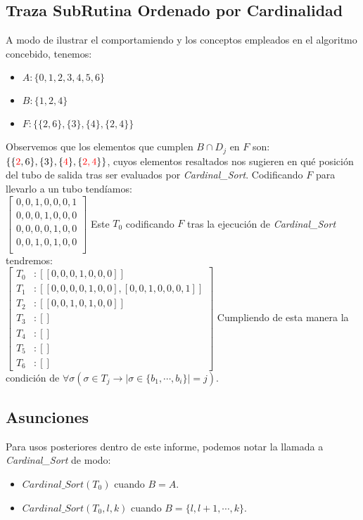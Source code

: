 \documentclass[12pt, letterpaper, twoside]{article}
\begin{document}
    \subsection{Traza SubRutina Ordenado por Cardinalidad}
    A modo de ilustrar el comportamiendo y los conceptos empleados en el algoritmo concebido, tenemos:
    \begin{itemize}
        \item $A: \{0, 1, 2, 3, 4, 5, 6\}$
        \item $B: \{1, 2, 4\}$
        \item $F: \{\{2, 6\}, \{3\}, \{4\}, \{2, 4\}\}$
    \end{itemize}
    Observemos que los elementos que cumplen $B\cap D_j$ en $F$ son: $\{\{\textcolor{red}{2}, 6\}, \{3\}, \{\textcolor{red}{4}\}, \{\textcolor{red}{2, 4}\}\}$, cuyos elementos resaltados nos sugieren en qué posición del tubo de salida tras ser evaluados por \emph{Cardinal\_Sort}. Codificando $F$ para llevarlo a un tubo tendíamos: \\
    $
        \begin{bmatrix}
            0, 0, 1, 0, 0, 0, 1 \\
            0, 0, 0, 1, 0, 0, 0 \\
            0, 0, 0, 0, 1, 0, 0 \\
            0, 0, 1, 0, 1, 0, 0 \\
        \end{bmatrix}
    $
    Este $T_0$ codificando $F$ tras la ejecución de \emph{Cardinal\_Sort} tendremos: \\
    $
    \begin{bmatrix}
            T_0&: [[0, 0, 0, 1, 0, 0, 0]] \\
            T_1&: [[0, 0, 0, 0, 1, 0, 0], [0, 0, 1, 0, 0, 0, 1]] \\
            T_2&: [[0, 0, 1, 0, 1, 0, 0]] \\
            T_3&: [] \\
            T_4&: [] \\
            T_5&: [] \\
            T_6&: [] 
    \end{bmatrix}
    $
    Cumpliendo de esta manera la condición de $\forall\sigma(\sigma\in T_j \rightarrow|\sigma\in\{b_1,\cdots,b_i\}|=j)$.

    \subsection{Asunciones}
    Para usos posteriores dentro de este informe, podemos notar la llamada a \emph{Cardinal\_Sort} de modo:
    \begin{itemize}
        \item $Cardinal\_Sort(T_0)$ cuando $B=A$.
        \item $Cardinal\_Sort(T_0, l, k)$ cuando $B=\{l, l+1,\cdots,k\}$.
    \end{itemize}
\end{document}
